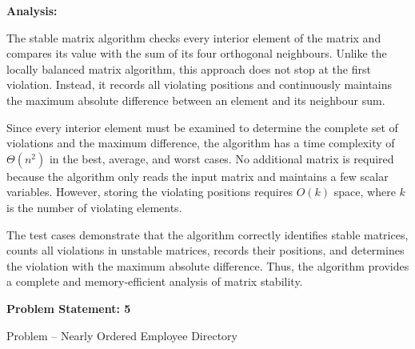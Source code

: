 \documentclass[12pt]{article}
\begin{document}
\textbf{Analysis:}

The stable matrix algorithm checks every interior element of the matrix and compares its value with the sum of its four orthogonal neighbours. Unlike the locally balanced matrix algorithm, this approach does not stop at the first violation. Instead, it records all violating positions and continuously maintains the maximum absolute difference between an element and its neighbour sum.

Since every interior element must be examined to determine the complete set of violations and the maximum difference, the algorithm has a time complexity of $\Theta(n^2)$ in the best, average, and worst cases. No additional matrix is required because the algorithm only reads the input matrix and maintains a few scalar variables. However, storing the violating positions requires $O(k)$ space, where $k$ is the number of violating elements.

The test cases demonstrate that the algorithm correctly identifies stable matrices, counts all violations in unstable matrices, records their positions, and determines the violation with the maximum absolute difference. Thus, the algorithm provides a complete and memory-efficient analysis of matrix stability.


\newpage

\textbf{Problem Statement: 5}


Problem – Nearly Ordered Employee Directory
\end{document}
